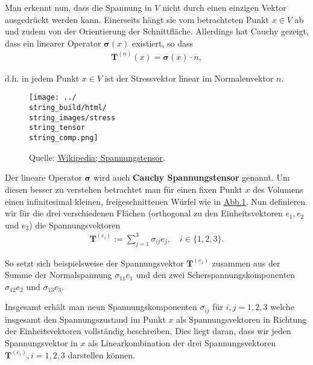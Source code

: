 \documentclass[letterpaper,10pt,german]{jupyterBook}
\begin{document}
\par
Man erkennt nun, dass die Spannung in \(V\) nicht durch einen einzigen Vektor ausgedrückt werden kann. Einerseits hängt sie vom betrachteten Punkt \(x\in V\) ab und zudem von der Orientierung der Schnittfläche. Allerdings hat Cauchy gezeigt, dass ein linearer Operator \(\mathbf{\sigma}(x)\) existiert, so dass
\begin{align*}
\mathbf{T}^{(n)}(x) = \mathbf{\sigma}(x) \cdot n,
\end{align*}
\par
d.h. in jedem Punkt \(x\in V\) ist der Stressvektor linear im Normalenvektor \(n\).

\begin{figure}[htbp]
\centering


\noindent\texttt{[image: ../\\string\_build/html/\\string\_images/stress\\string\_tensor\\string\_comp.png]}
\caption{Quelle: \href{https://de.wikipedia.org/wiki/Spannungstensor}{Wikipedia; Spannungstensor}.}\label{\detokenize{vektoranalysis/tensor:fig-stress-comp}}\end{figure}

\par
Der lineare Operator \(\mathbf{\sigma}\) wird auch \textbf{Cauchy Spannungstensor} genannt.
Um diesen besser zu verstehen betrachtet man für einen fixen Punkt \(x\) des Volumens einen infinitesimal kleinen, freigeschnittenen Würfel wie in \hyperref[\detokenize{vektoranalysis/tensor:fig-stress-comp}]{Abb.\@ \ref{\detokenize{vektoranalysis/tensor:fig-stress-comp}}}.
Nun definieren wir für die drei verschiedenen Flächen (orthogonal zu den Einheitsvektoren \(e_1, e_2\) und \(e_3\)) die Spannungsvektoren
\begin{align*}
\mathbf{T}^{(e_i)}:= \sum_{j=1}^3 \sigma_{ij} e_j, \quad i \in \lbrace 1,2,3 \rbrace.
\end{align*}
\par
So setzt sich beispielsweise der Spannungsvektor \(\mathbf{T}^{(e_1)}\) zusammen aus der Summe der Normalspannung \(\sigma_{11} e_1\) und den zwei Scherspannungskomponenten \(\sigma_{12} e_2\) und \(\sigma_{13} e_3\).

\par
Insgesamt erhält man neun Spannungskomponenten \(\sigma_{ij}\) für \(i,j=1,2,3\) welche insgesamt den Spannungszustand im Punkt \(x\) als Spannungsvektoren in Richtung der Einheitsvektoren vollständig beschreiben.
Dies liegt daran, dass wir jeden Spannungsvektor in \(x\) als Linearkombination der drei Spannungsvektoren \(\mathbf{T}^{(e_i)}, i=1,2,3\) darstellen können.
\end{document}
